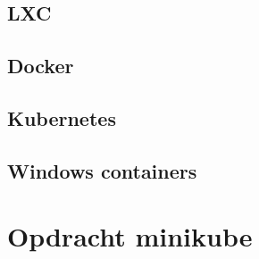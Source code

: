 \documentclass[a4paper,12pt,twoside,openright,titlepage]{book}
\begin{document}
\subsection{LXC}
\subsection{Docker}
\subsection{Kubernetes}
\subsection{Windows containers}

\section{Opdracht minikube}


\printindex
\end{document}

